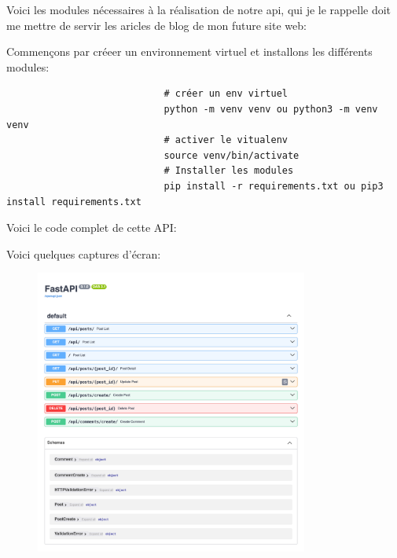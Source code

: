 \documentclass[a4paper,11pt]{article}
\begin{document}
                \noindent Voici les modules nécessaires à la réalisation de notre api, qui je le rappelle doit me mettre de servir 
                les aricles de blog de mon future site web: 

                

                \noindent Commençons par créeer un environnement virtuel et installons les différents modules:
                    \begin{tcolorbox}[colback=lightgray!6, colframe=black, left=-40mm, right=5mm, top=2mm, bottom=-2mm, boxrule=0.1mm]
                        \begin{verbatim}
                            # créer un env virtuel
                            python -m venv venv ou python3 -m venv venv 
                            # activer le vitualenv
                            source venv/bin/activate 
                            # Installer les modules
                            pip install -r requirements.txt ou pip3 install requirements.txt
                        \end{verbatim}
                    \end{tcolorbox}
            \newpage
            \noindent Voici le code complet de cette API: 

            
            
            \newpage
            \noindent Voici quelques captures d'écran: 
            \begin{figure}[ht]
                \includegraphics[width=0.8\textwidth]{TP-3/EXERCICE-3.1-A-RENDRE/screenshots/doc.png}
            \end{figure}
\end{document}
